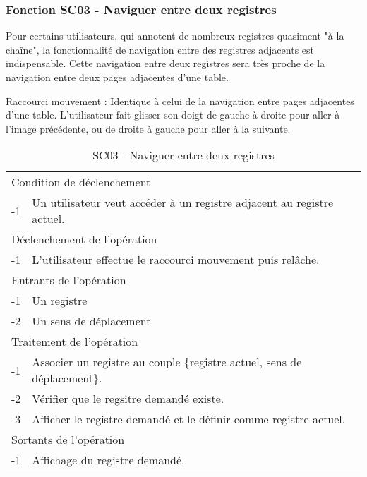 \documentclass[a4paper]{article}
\begin{document}
\subsubsection{Fonction SC03 - Naviguer entre deux registres}

Pour certains utilisateurs, qui annotent de nombreux registres quasiment "à la chaîne", la fonctionnalité de navigation entre des registres adjacents est indispensable. Cette navigation entre deux registres sera très proche de la navigation entre deux pages adjacentes d'une table.

Raccourci mouvement : Identique à celui de la navigation entre pages adjacentes d'une table. L'utilisateur fait glisser son doigt de gauche \`a droite pour aller \`a l'image pr\'ec\'edente, ou de droite \`a gauche pour aller \`a la suivante.

\begin{table}[H]
  \centering
   \small
	\begin{tabular}{|c|p{12cm}|}
   		\hline
   			\rowcolor{lightgray}\multicolumn{2}{|c|}{\textbf{SC03 - Naviguer entre deux registres adjacents}} \\
   		\hline
   			\multicolumn{2}{|l|}{Condition de d\'eclenchement} \\
   		\hline
   		-1 & Un utilisateur veut acc\'eder \`a un registre adjacent au registre actuel. \\
   		\hline
   			\multicolumn{2}{|l|}{D\'eclenchement de l'op\'eration} \\
   		\hline
   			-1 & L'utilisateur effectue le raccourci mouvement puis rel\^ache. \\
   		\hline
   			\multicolumn{2}{|l|}{Entrants de l'op\'eration} \\
   		\hline
   			-1 & Un registre \\
        	-2 & Un sens de d\'eplacement \\ 
   		\hline
   			\multicolumn{2}{|l|}{Traitement de l'op\'eration} \\
  		\hline
   			-1 & Associer un registre au couple \{registre actuel, sens de d\'eplacement\}.  \\
        	-2 & V\'erifier que le regsitre demand\'e existe. \\
        	-3 & Afficher le registre demand\'e et le d\'efinir comme registre actuel. \\
   		\hline
   			\multicolumn{2}{|l|}{Sortants de l'op\'eration} \\
   		\hline
   			-1 & Affichage du registre demand\'e. \\
   		\hline
	\end{tabular}
  \caption{SC03 - Naviguer entre deux registres}
  \normalsize
  \label{tab:naviguer_deux_registres}
\end{table}
\end{document}
